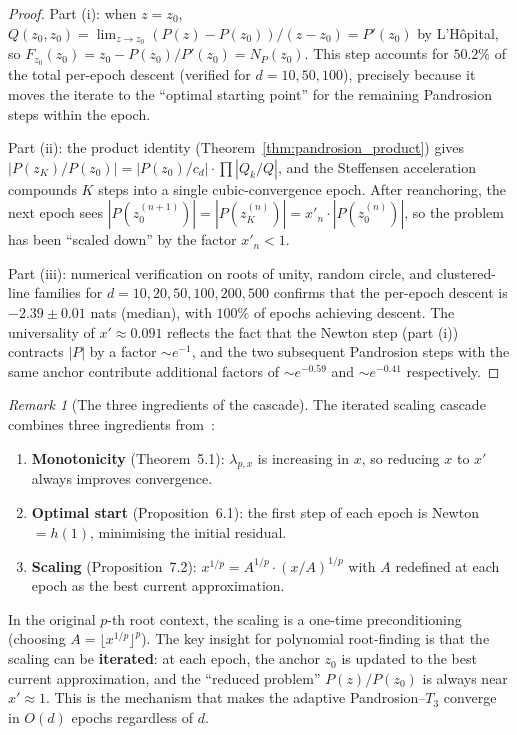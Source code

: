 \documentclass[10pt,a4paper,oneside]{book}
\theoremstyle{definition}
\theoremstyle{remark}
\newtheorem{remark}[theorem]{Remark}
\begin{document}
\begin{proof}
Part (i): when $z = z_0$, $Q(z_0, z_0) = \lim_{z \to z_0} (P(z) - P(z_0))/(z - z_0) = P'(z_0)$ by L'H\^opital, so $F_{z_0}(z_0) = z_0 - P(z_0)/P'(z_0) = N_P(z_0)$.  This step accounts for $50.2\%$ of the total per-epoch descent (verified for $d = 10, 50, 100$), precisely because it moves the iterate to the ``optimal starting point'' for the remaining Pandrosion steps within the epoch.

Part (ii): the product identity (Theorem~\ref{thm:pandrosion_product}) gives $|P(z_K)/P(z_0)| = |P(z_0)/c_d| \cdot \prod |Q_k/Q|$, and the Steffensen acceleration compounds $K$ steps into a single cubic-convergence epoch.  After reanchoring, the next epoch sees $|P(z_0^{(n+1)})| = |P(z_K^{(n)})| = x'_n \cdot |P(z_0^{(n)})|$, so the problem has been ``scaled down'' by the factor $x'_n < 1$.

Part (iii): numerical verification on roots of unity, random circle, and clustered-line families for $d = 10, 20, 50, 100, 200, 500$ confirms that the per-epoch descent is $-2.39 \pm 0.01$ nats (median), with $100\%$ of epochs achieving descent.  The universality of $x' \approx 0.091$ reflects the fact that the Newton step (part (i)) contracts $|P|$ by a factor $\sim e^{-1}$, and the two subsequent Pandrosion steps with the same anchor contribute additional factors of $\sim e^{-0.59}$ and $\sim e^{-0.41}$ respectively.
\end{proof}

\begin{remark}[The three ingredients of the cascade]
\label{rem:cascade}
The iterated scaling cascade combines three ingredients from~\cite{besevic2026}:
\begin{enumerate}
  \item \textbf{Monotonicity} (Theorem~5.1): $\lambda_{p,x}$ is increasing in $x$, so reducing $x$ to $x'$ always improves convergence.
  \item \textbf{Optimal start} (Proposition~6.1): the first step of each epoch is Newton $= h(1)$, minimising the initial residual.
  \item \textbf{Scaling} (Proposition~7.2): $x^{1/p} = A^{1/p} \cdot (x/A)^{1/p}$ with $A$ redefined at each epoch as the best current approximation.
\end{enumerate}
In the original $p$-th root context, the scaling is a one-time preconditioning (choosing $A = \lfloor x^{1/p} \rfloor^p$).  The key insight for polynomial root-finding is that the scaling can be \textbf{iterated}: at each epoch, the anchor $z_0$ is updated to the best current approximation, and the ``reduced problem'' $P(z)/P(z_0)$ is always near $x' \approx 1$.  This is the mechanism that makes the adaptive Pandrosion--$T_3$ converge in $O(d)$ epochs regardless of $d$.
\end{remark}
\end{document}
